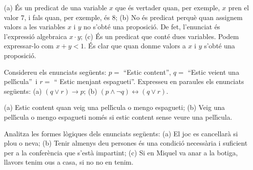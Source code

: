 \begin{solucio}
(a) \'{E}s un predicat de una variable $x$ que \'{e}s vertader quan, per
exemple, $x$ pren el valor $7$, i fals quan, per exemple, \'{e}s $8$; (b) No
\'{e}s predicat perqu\`{e} quan assignem valors a les variables $x$ i $y$ no
s'obt\'{e} una proposici\'{o}. De fet, l'enunciat \'{e}s l'expressi\'{o}
algebraica $x\cdot y$; (c) \'{E}s un predicat que cont\'{e} dues variables.
Podem expressar-lo com $x+y<1$. \'{E}s clar que quan donme valors a $x$ i $y$
s'obt\'{e} una proposici\'{o}.
\end{solucio}

\begin{exercici}
Considereu els enunciats seg\"{u}ents: $p=$ \textquotedblleft Estic
content\textquotedblright, $q=$ \textquotedblleft Estic veient una
pel\textperiodcentered l\'{\i}cula\textquotedblright\ i $r=$ \textquotedblleft
Estic menjant espagueti\textquotedblright. Expresseu en paraules els enunciats
seg\"{u}ents: (a) $\left(  q\vee r\right)  \longrightarrow p$; (b) $\left(
p\wedge\lnot q\right)  \longleftrightarrow\left(  q\vee r\right)  $.
\end{exercici}

\begin{solucio}
(a) Estic content quan veig una pel\textperiodcentered l\'{\i}cula o mengo
espagueti; (b) Veig una pel\textperiodcentered l\'{\i}cula o mengo espagueti
nom\'{e}s si estic content sense veure una pel\textperiodcentered l\'{\i}cula.
\end{solucio}

\begin{exercici}
Analitza les formes l\`{o}giques dels enunciats seg\"{u}ents: (a) El joc es
cancel\textperiodcentered lar\`{a} si plou o neva; (b) Tenir almenys deu
persones \'{e}s una condici\'{o} necess\`{a}ria i suficient per a la
confer\`{e}ncia que s'est\`{a} impartint; (c) Si en Miquel va anar a la
botiga, llavors tenim ous a casa, si no no en tenim.
\end{exercici}

